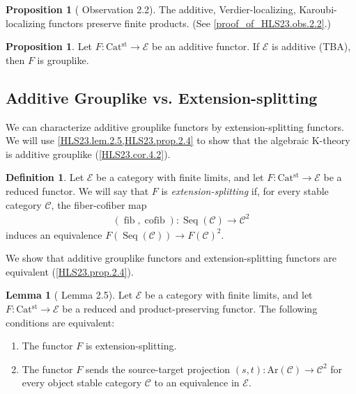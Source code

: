 \documentclass[a4paper,dvipdfmx,11pt,reqno]{amsart}
\DeclareMathOperator{\fib}{fib}
\DeclareMathOperator{\cofib}{cofib}
\newcommand{\C}{\mathcal{C}}
\newcommand{\E}{\mathcal{E}}
\DeclareMathOperator{\Seq}{Seq}
\newcommand{\Catst}{\mathrm{Cat^{st}}}
\newcommand{\Ar}{\mathrm{Ar}}
\theoremstyle{definition}
\newtheorem{definition}[theorem]{Definition}
\newtheorem{lemma}[theorem]{Lemma}
\newtheorem{proposition}[theorem]{Proposition}
\begin{document}
\begin{proposition}[\cite{HLS23} Observation 2.2] \label{HLS23.obs.2.2} %
  The additive, Verdier-localizing, Karoubi-localizing functors preserve finite products.
  (See \cref{proof_of_HLS23.obs.2.2}.)
\end{proposition}

\begin{proposition} \label{Ber.rem.3.65}
  Let $F : \Catst \to \E$ be an additive functor.
  If $\E$ is additive (TBA), then $F$ is grouplike.
\end{proposition}

\subsection{Additive Grouplike vs. Extension-splitting}

We can characterize additive grouplike functors by extension-splitting functors.
We will use \cref{HLS23.lem.2.5,HLS23.prop.2.4} to show that the algebraic K-theory is additive grouplike (\cref{HLS23.cor.4.2}).

\begin{definition}
  Let $\E$ be a category with finite limits, and let $F : \Catst \to \E$ be a reduced functor.
  We will say that $F$ is \textit{extension-splitting} if, for every stable category $\C$, the fiber-cofiber map
  \begin{align*}
    (\fib,\cofib) : \Seq(\C) \to \C^2
  \end{align*}
  induces an equivalence $F(\Seq(\C)) \to F(\C)^2$.
\end{definition}

We show that additive grouplike functors and extension-splitting functors are equivalent (\cref{HLS23.prop.2.4}). 

\begin{lemma}[\cite{HLS23} Lemma 2.5] \label{HLS23.lem.2.5}
  Let $\E$ be a category with finite limits, and let $F : \Catst \to \E$ be a reduced and product-preserving functor.
  The following conditions are equivalent:
  \begin{enumerate}
    \item The functor $F$ is extension-splitting.
    \item The functor $F$ sends the source-target projection $(s,t) : \Ar(\C) \to \C^2$ for every object stable category $\C$ to an equivalence in $\E$.
  \end{enumerate}
\end{lemma}
\end{document}
